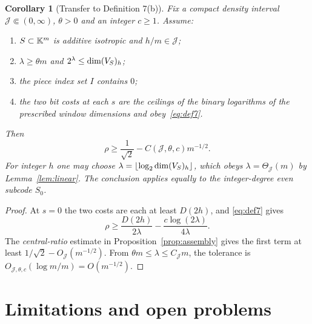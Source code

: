 \documentclass[10pt,a4paper]{article}
\numberwithin{equation}{section}
\newtheorem{corollary}[theorem]{Corollary}
\theoremstyle{remark}\newtheorem{remark}[theorem]{Remark}\newtheorem{question}[theorem]{Question}
\begin{document}
\begin{corollary}[Transfer to Definition 7(b)]\label{cor:def7}
Fix a compact density interval $\mathcal J\Subset(0,\infty)$, $\theta>0$ and an integer $c\ge1$. Assume:
\begin{enumerate}[label=\textup{(\roman*)}]
\item $S\subset\mathbb K^m$ is additive isotropic and $h/m\in \mathcal J$;
\item $\lambda\ge\theta m$ and $2^\lambda\le\operatorname{dim}(V_S)_h$;
\item the piece index set $I$ contains $0$;
\item the two bit costs at each $s$ are the \emph{ceilings} of the binary logarithms of the prescribed window dimensions and obey~\eqref{eq:def7}.
\end{enumerate}
Then
\begin{equation}\label{eq:transfer}
\rho\ge\frac1{\sqrt2}-C(\mathcal J,\theta,c)m^{-1/2}.
\end{equation}
For integer $h$ one may choose $\lambda=\lfloor\log_2\operatorname{dim}(V_S)_h\rfloor$, which obeys $\lambda=\Theta_{\mathcal J}(m)$ by Lemma~\ref{lem:linear}. The conclusion applies equally to the integer-degree even subcode $S_0$.
\end{corollary}
\begin{proof}At $s=0$ the two costs are each at least $D(2h)$, and \eqref{eq:def7} gives
\[
\rho\ge\frac{D(2h)}{2\lambda}-\frac{c\log(2\lambda)}{4\lambda}.
\]
The \emph{central-ratio} estimate in Proposition~\ref{prop:assembly} gives the first term at least $1/\sqrt2-O_{\mathcal J}(m^{-1/2})$. From $\theta m\le\lambda\le C_{\mathcal J}m$, the tolerance is $O_{\mathcal J,\theta,c}(\log m/m)=O(m^{-1/2})$.\end{proof}



\section{Limitations and open problems}\label{sec:open}
\end{document}

